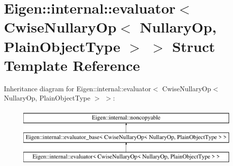 \hypertarget{struct_eigen_1_1internal_1_1evaluator_3_01_cwise_nullary_op_3_01_nullary_op_00_01_plain_object_type_01_4_01_4}{}\section{Eigen\+::internal\+::evaluator$<$ Cwise\+Nullary\+Op$<$ Nullary\+Op, Plain\+Object\+Type $>$ $>$ Struct Template Reference}
\label{struct_eigen_1_1internal_1_1evaluator_3_01_cwise_nullary_op_3_01_nullary_op_00_01_plain_object_type_01_4_01_4}
Inheritance diagram for Eigen\+::internal\+::evaluator$<$ Cwise\+Nullary\+Op$<$ Nullary\+Op, Plain\+Object\+Type $>$ $>$\+:\begin{figure}[H]
\begin{center}
\leavevmode
\includegraphics[height=3.000000cm]{struct_eigen_1_1internal_1_1evaluator_3_01_cwise_nullary_op_3_01_nullary_op_00_01_plain_object_type_01_4_01_4}
\end{center}
\end{figure}
